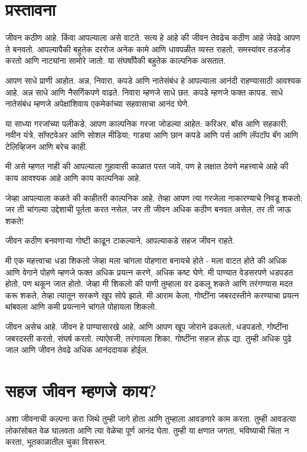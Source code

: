 \chapter*{प्रस्तावना}

जीवन कठीण आहे. किंवा आपल्याला असे वाटते.
सत्य हे आहे की जीवन तेवढेच कठीण आहे जेवढे आपण ते बनवतो.
आपल्यापैकी बहुतेक दररोज अनेक कामे आणि धावपळीत व्यस्त राहतो, समस्यांवर तडजोड करतो आणि नाट्यांना सामोरे जातो. या संघर्षांपैकी बहुतेक काल्पनिक असतात.

आपण साधे प्राणी आहोत. अन्न, निवारा, कपडे आणि नातेसंबंध हे आपल्याला आनंदी राहण्यासाठी आवश्यक आहे. अन्न साधे आणि नैसर्गिकपणे वाढते. निवारा म्हणजे साधे छत. कपडे म्हणजे फक्त कापड. साधे नातेसंबंध म्हणजे अपेक्षांशिवाय एकमेकांच्या सहवासाचा आनंद घेणे.

या साध्या गरजांच्या पलीकडे, आपण काल्पनिक गरजा जोडल्या आहेत: करिअर, बॉस आणि सहकारी; नवीन यंत्रे, सॉफ्टवेअर आणि सोशल मीडिया; गाड्या आणि छान कपडे आणि पर्स आणि लॅपटॉप बॅग आणि टेलिव्हिजन आणि बरेच काही.

मी असे म्हणत नाही की आपल्याला गुहावासी काळात परत जावे, पण हे लक्षात ठेवणे महत्त्वाचे आहे की काय आवश्यक आहे आणि काय काल्पनिक आहे.

जेव्हा आपल्याला कळते की काहीतरी काल्पनिक आहे, तेव्हा आपण त्या गरजेला नाकारण्याचे निवडू शकतो; जर ती चांगल्या उद्देशाची पूर्तता करत नसेल, जर ती जीवन अधिक कठीण बनवत असेल, तर ती जाऊ शकते!

जीवन कठीण बनवणाऱ्या गोष्टी काढून टाकल्याने, आपल्याकडे सहज जीवन राहते.

मी एक महत्त्वाचा धडा शिकलो जेव्हा मला चांगला पोहणारा बनायचे होते - मला वाटत होते की अधिक आणि वेगाने पोहणे म्हणजे फक्त अधिक प्रयत्न करणे, अधिक कष्ट घेणे. मी पाण्यात वेडसरपणे धडपडत होतो, पण थकून जात होतो. जेव्हा मी शिकलो की पाणी तुम्हाला वर ढकलू शकते आणि तरंगण्यास मदत करू शकते, तेव्हा त्यातून सरकणे खूप सोपे झाले. मी आराम केला, गोष्टींना जबरदस्तीने करण्याचा प्रयत्न थांबवला आणि कमी प्रयत्नाने चांगले पोहायला शिकलो.

जीवन असेच आहे. जीवन हे पाण्यासारखे आहे, आणि आपण खूप जोराने ढकलतो, धडपडतो, गोष्टींना जबरदस्ती करतो, संघर्ष करतो. त्याऐवजी, तरंगायला शिका, गोष्टींना सहज होऊ द्या. तुम्ही अधिक पुढे जाल आणि जीवन तेवढे अधिक आनंददायक होईल.

\chapter{ सहज जीवन म्हणजे काय?}

अशा जीवनाची कल्पना करा जिथे तुम्ही जागे होता आणि तुम्हाला आवडणारे काम करता. तुम्ही आवडत्या लोकांसोबत वेळ घालवता आणि त्या वेळेचा पूर्ण आनंद घेता. तुम्ही या क्षणात जगता, भविष्याची चिंता न करता, भूतकाळातील चुका विसरून.

